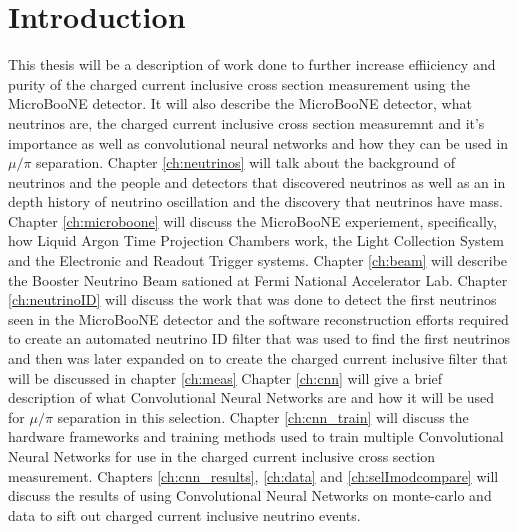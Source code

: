\chapter{Introduction}
This thesis will be a description of work done to further increase effiiciency and purity of the charged current inclusive cross section measurement using the MicroBooNE detector. It will also describe the MicroBooNE detector, what neutrinos are, the charged current inclusive cross section measuremnt and it's importance as well as convolutional neural networks and how they can be used in $\mu/\pi$ separation. 
Chapter \ref{ch:neutrinos} will talk about the background of neutrinos and the people and detectors that discovered neutrinos as well as an in depth history of neutrino oscillation and the discovery that neutrinos have mass. 
Chapter \ref{ch:microboone} will discuss the MicroBooNE experiement, specifically,  how Liquid Argon Time Projection Chambers work, the Light Collection System and the Electronic and Readout Trigger systems.
Chapter \ref{ch:beam} will describe the Booster Neutrino Beam sationed at Fermi National Accelerator Lab. 
Chapter \ref{ch:neutrinoID} will discuss the work that was done to detect the first neutrinos seen in the MicroBooNE detector and the software reconstruction efforts required to create an automated neutrino ID filter that was used to find the first neutrinos and then was later expanded on to create the charged current inclusive filter that will be discussed in chapter \ref{ch:meas}
Chapter \ref{ch:cnn} will give a brief description of what Convolutional Neural Networks are and how it will be used for $\mu/\pi$ separation in this selection.
Chapter \ref{ch:cnn_train} will discuss the hardware frameworks and training methods used to train multiple Convolutional Neural Networks for use in the charged current inclusive cross section measurement.
Chapters \ref{ch:cnn_results}, \ref{ch:data} and \ref{ch:selImodcompare} will discuss the results of using Convolutional Neural Networks on monte-carlo and data to sift out charged current inclusive neutrino events. 
